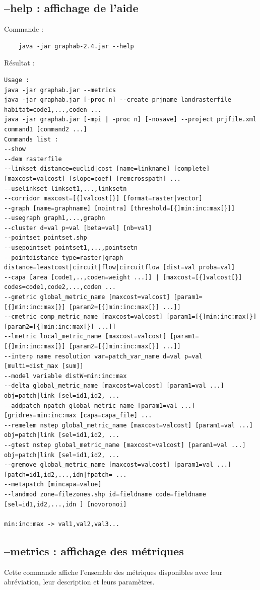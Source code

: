 \documentclass[a4paper,10pt]{report}
\begin{document}
\subsection{--help : affichage de l'aide}
Commande :
\begin{Verbatim}
	java -jar graphab-2.4.jar --help
\end{Verbatim}
Résultat :
\begin{verbatim}
Usage :
java -jar graphab.jar --metrics
java -jar graphab.jar [-proc n] --create prjname landrasterfile habitat=code1,...,coden ...
java -jar graphab.jar [-mpi | -proc n] [-nosave] --project prjfile.xml command1 [command2 ...]
Commands list :
--show
--dem rasterfile
--linkset distance=euclid|cost [name=linkname] [complete] [maxcost=valcost] [slope=coef] [remcrosspath] ...
--uselinkset linkset1,...,linksetn
--corridor maxcost=[{]valcost[}] [format=raster|vector]
--graph [name=graphname] [nointra] [threshold=[{]min:inc:max[}]]
--usegraph graph1,...,graphn
--cluster d=val p=val [beta=val] [nb=val]
--pointset pointset.shp
--usepointset pointset1,...,pointsetn
--pointdistance type=raster|graph distance=leastcost|circuit|flow|circuitflow [dist=val proba=val]
--capa [area [code1,..,coden=weight ...]] | [maxcost=[{]valcost[}] codes=code1,code2,...,coden ...
--gmetric global_metric_name [maxcost=valcost] [param1=[{]min:inc:max[}] [param2=[{]min:inc:max[}] ...]]
--cmetric comp_metric_name [maxcost=valcost] [param1=[{]min:inc:max[}] [param2=[{]min:inc:max[}] ...]]
--lmetric local_metric_name [maxcost=valcost] [param1=[{]min:inc:max[}] [param2=[{]min:inc:max[}] ...]]
--interp name resolution var=patch_var_name d=val p=val [multi=dist_max [sum]]
--model variable distW=min:inc:max
--delta global_metric_name [maxcost=valcost] [param1=val ...] obj=patch|link [sel=id1,id2, ...
--addpatch npatch global_metric_name [param1=val ...] [gridres=min:inc:max [capa=capa_file] ...
--remelem nstep global_metric_name [maxcost=valcost] [param1=val ...] obj=patch|link [sel=id1,id2, ...
--gtest nstep global_metric_name [maxcost=valcost] [param1=val ...] obj=patch|link [sel=id1,id2, ...
--gremove global_metric_name [maxcost=valcost] [param1=val ...] [patch=id1,id2,...,idn|fpatch= ...
--metapatch [mincapa=value]
--landmod zone=filezones.shp id=fieldname code=fieldname [sel=id1,id2,...,idn ] [novoronoi]

min:inc:max -> val1,val2,val3...
\end{verbatim}

\subsection{--metrics : affichage des métriques}
Cette commande affiche l'ensemble des métriques disponibles avec leur abréviation, leur description et leurs paramètres.
\end{document}
